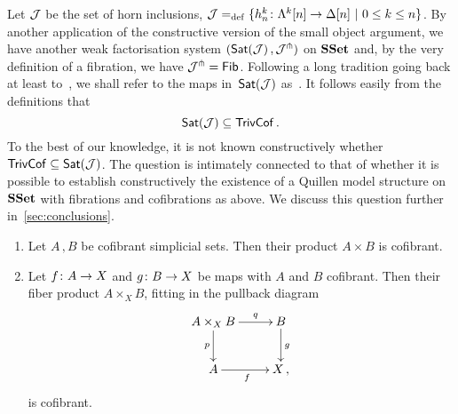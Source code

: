 \documentclass[reqno,10pt,a4paper,oneside,draft]{amsart}
\begin{document}
\begin{remark} Let $\cal{J}$ be the set of horn inclusions, \ie $\cal{J} \defeq \{ h^k_n  \co \Lambda^k[n] \to \Delta[n]  \ | \ 0 \leq k \leq n \}$. By another application of the constructive version of the small object argument, we have another weak factorisation system $( \mathsf{Sat}(\cal{J}) \, , \cal{J}^\pitchfork)$ on $\SSet$ and, by the very definition of a fibration, we have $\cal{J}^\pitchfork = \Fib$. Following a long tradition going back at least to~\cite{gabriel-zisman:calculus-of-fractions}, we shall refer to the maps in~$\mathsf{Sat}(\cal{J})$ as~. It follows easily from the definitions that 
\[
  \mathsf{Sat}(\cal{J}) \subseteq \TrivCof  \, .
\]
To the best of our knowledge, it is not known constructively whether $\TrivCof \subseteq \Sat(\cal{J})$. The question is intimately connected to that of whether it is possible to establish constructively the existence of a
Quillen model structure on $\SSet$ with fibrations and cofibrations as above. We discuss this question further in~\cref{sec:conclusions}.
 \end{remark}









 












\begin{proposition}\label{lem:cofibrant_fiber_product} \hfill 
\begin{enumerate}[$(i)$] 
\item Let $A \, , B$ be cofibrant simplicial sets. Then their product $A \times B$ is cofibrant.
\item Let $f \co A \to X$ and $g \co B \to X$ be maps with $A$ and $B$ cofibrant. Then their
fiber product $A \times_X B$, fitting in the pullback diagram
\[
\xymatrix{
A \times_X B \ar[r]^-{q} \ar[d]_-{p} & B \ar[d]^g \\
A \ar[r]_f & X \, ,}
\]
is cofibrant.
\end{enumerate}
\end{proposition}
\end{document}
